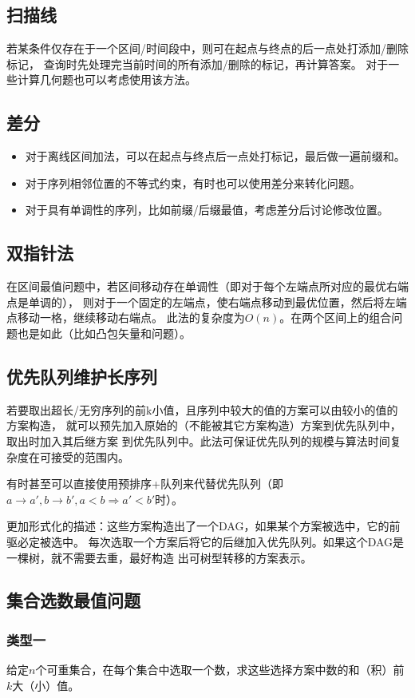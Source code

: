 \subsection{扫描线}
若某条件仅存在于一个区间/时间段中，则可在起点与终点的后一点处打添加/删除标记，
查询时先处理完当前时间的所有添加/删除的标记，再计算答案。
对于一些计算几何题也可以考虑使用该方法。
\subsection{差分}
\begin{itemize}
	\item 对于离线区间加法，可以在起点与终点后一点处打标记，最后做一遍前缀和。
	\item 对于序列相邻位置的不等式约束，有时也可以使用差分来转化问题。
	\item 对于具有单调性的序列，比如前缀/后缀最值，考虑差分后讨论修改位置。
\end{itemize}
\subsection{双指针法}
在区间最值问题中，若区间移动存在单调性（即对于每个左端点所对应的最优右端点是单调的），
则对于一个固定的左端点，使右端点移动到最优位置，然后将左端点移动一格，继续移动右端点。
此法的复杂度为$O(n)$。在两个区间上的组合问题也是如此（比如凸包矢量和问题）。
\subsection{优先队列维护长序列}\label{PQS}
若要取出超长/无穷序列的前k小值，且序列中较大的值的方案可以由较小的值的方案构造，
就可以预先加入原始的（不能被其它方案构造）方案到优先队列中，取出时加入其后继方案
到优先队列中。此法可保证优先队列的规模与算法时间复杂度在可接受的范围内。

有时甚至可以直接使用预排序+队列来代替优先队列（即$a\rightarrow a',b\rightarrow b',
	a<b\Rightarrow a'<b'$时）。

更加形式化的描述：这些方案构造出了一个DAG，如果某个方案被选中，它的前驱必定被选中。
每次选取一个方案后将它的后继加入优先队列。如果这个DAG是一棵树，就不需要去重，最好构造
出可树型转移的方案表示。

\subsection{集合选数最值问题}
\subsubsection{类型一}
给定$n$个可重集合，在每个集合中选取一个数，求这些选择方案中数的和（积）前$k$大（小）值。

